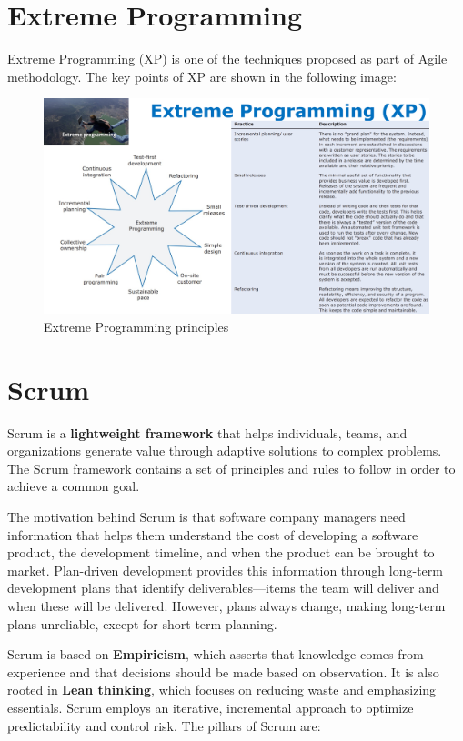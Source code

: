 \section{Extreme Programming}

Extreme Programming (XP) is one of the techniques proposed as part of Agile methodology. The key points of XP are shown in the following image:

\begin{figure} [H]
    \centering
    \includegraphics[width=1\textwidth]{images/Agile/ExtremeProgramming.png}
    \caption{Extreme Programming principles}
    \label{fig:extremeprogramming}
\end{figure} 

\section{Scrum}

Scrum is a \textbf{lightweight framework} that helps individuals, teams, and organizations generate value through adaptive solutions to complex problems. The Scrum framework contains a set of principles and rules to follow in order to achieve a common goal.

The motivation behind Scrum is that software company managers need information that helps them understand the cost of developing a software product, the development timeline, and when the product can be brought to market. Plan-driven development provides this information through long-term development plans that identify deliverables—items the team will deliver and when these will be delivered. However, plans always change, making long-term plans unreliable, except for short-term planning.

Scrum is based on \textbf{Empiricism}, which asserts that knowledge comes from experience and that decisions should be made based on observation. It is also rooted in \textbf{Lean thinking}, which focuses on reducing waste and emphasizing essentials. Scrum employs an iterative, incremental approach to optimize predictability and control risk. The pillars of Scrum are:

